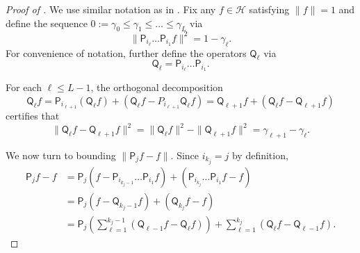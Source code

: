 \documentclass[10pt,a4paper]{amsart}
\begin{document}
\begin{proof}[Proof of ]
We use similar notation as in . Fix any $f\in \mathcal{H}$ satisfying $\|f\|=1$ and define the sequence $0:=\gamma_0\leq \gamma_1\leq\ldots\leq \gamma_L$ via
\begin{equation*}
    \|\mathsf{P}_{i_{\ell}}\ldots \mathsf{P}_{i_1}f\|^2=1-\gamma_{\ell}.
\end{equation*}
For convenience of notation, further define the operators $\mathsf{Q}_{\ell}$ via 
\begin{equation*}
    \mathsf{Q}_{\ell} = \mathsf{P}_{i_{\ell}}\ldots \mathsf{P}_{i_1}.
\end{equation*}

For each $\ell\leq L-1$, the orthogonal decomposition
    \begin{equation*}
        \mathsf{Q}_{{\ell}}f = \mathsf{P}_{i_{\ell+1}}( \mathsf{Q}_{{\ell}}f)+(\mathsf{Q}_{{\ell}}f-P_{i_{\ell+1}}\mathsf{Q}_{{\ell}} f)= \mathsf{Q}_{{\ell+1}}f+(\mathsf{Q}_{{\ell}}f-\mathsf{Q}_{{\ell+1}} f)
    \end{equation*}
    certifies that
    \begin{equation}
    \label{eq:telescope}
        \|\mathsf{Q}_{{\ell}}f-\mathsf{Q}_{{\ell+1}} f\|^2=\|\mathsf{Q}_{{\ell}}f\|^2-\|\mathsf{Q}_{{\ell+1}}f\|^2=\gamma_{\ell+1}-\gamma_{\ell}.
    \end{equation}

    We now turn to bounding $\|\mathsf{P}_j f-f\|$. Since $i_{k_j}=j$ by definition,
    \begin{align*}
        \mathsf{P}_j f-f &= \mathsf{P}_{j}(f-\mathsf{P}_{i_{k_{j}-1}}\ldots \mathsf{P}_{i_1} f) + (\mathsf{P}_{i_{k_j}}\ldots \mathsf{P}_{i_1}f -f)\\
        &= \mathsf{P}_{j}(f-\mathsf{Q}_{{k_{j}-1}} f) + (\mathsf{Q}_{{k_j}}f -f)\\
        &=\mathsf{P}_{j}\left(\sum_{\ell=1}^{k_j-1} (\mathsf{Q}_{{\ell-1}} f-\mathsf{Q}_{{\ell}} f)\right)+\sum_{\ell=1}^{k_j} (\mathsf{Q}_{{\ell}} f -  \mathsf{Q}_{{\ell-1}} f).
    \end{align*}


\end{proof}
\end{document}
